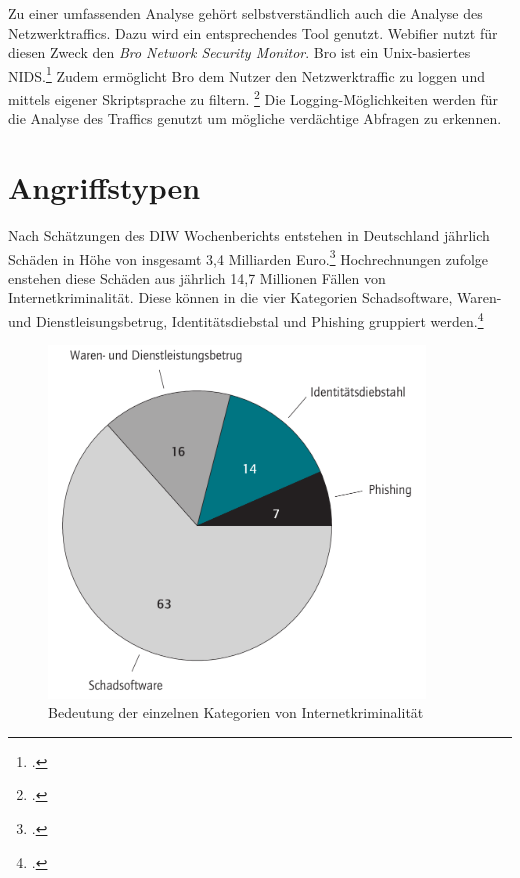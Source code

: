 Zu einer umfassenden Analyse gehört selbstverständlich auch die Analyse des Netzwerktraffics. Dazu wird ein entsprechendes Tool genutzt. Webifier nutzt für diesen Zweck den \textit{Bro Network Security Monitor}. Bro ist ein Unix-basiertes \ac{NIDS}.\footcite[Vgl.][199]{bro} Zudem ermöglicht Bro dem Nutzer den Netzwerktraffic zu loggen und mittels eigener Skriptsprache zu filtern. \footcite[Vgl.][]{bro2} Die Logging-Möglichkeiten werden für die Analyse des Traffics genutzt um mögliche verdächtige Abfragen zu erkennen.


\section{Angriffstypen}

Nach Schätzungen des DIW Wochenberichts entstehen in Deutschland jährlich Schäden in Höhe von insgesamt 3,4 Milliarden Euro.\footcite[Vgl.][301]{cybercrime} Hochrechnungen zufolge enstehen diese Schäden aus jährlich 14,7 Millionen Fällen von Internetkriminalität. Diese können in die vier Kategorien Schadsoftware, Waren- und Dienstleisungsbetrug, Identitätsdiebstal und Phishing gruppiert werden.\footcite[Vgl.][297]{cybercrime}

\begin{figure}[H]
  \centering
  \includegraphics[width=10cm]{images/kategorien-cybercrime}
  \caption[Bedeutung der einzelnen Kategorien von Internetkriminalität]{Bedeutung der einzelnen Kategorien von Internetkriminalität\protect\footnotemark}
  \label{fig:categories-cybercrime}
\end{figure}

